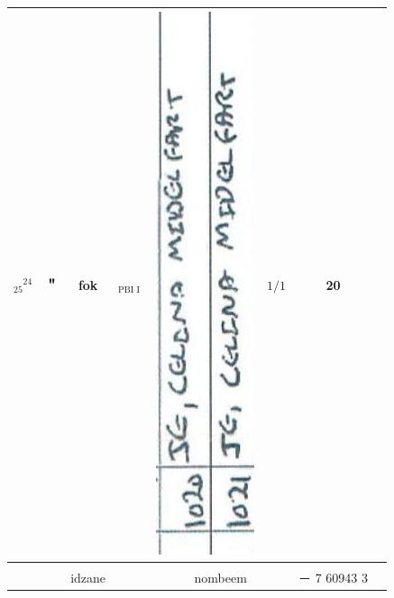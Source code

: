 \documentclass[10pt]{article}
\begin{document}
\begin{center}
\begin{tabular}{|c|c|c|c|c|c|c|c|c|c|}
\({ }_{25}{ }^{24}\) & ＂ & fok & \({ }_{\text {PBI I }}\) & \multicolumn{3}{|l|}{\includegraphics[max width=\textwidth]{2025_02_27_dd68c3d38de88f0516d9g-053(1)}
} & \(1 / 1\) & 20 &  \\
\hline
 &  &  &  &  &  &  &  &  &  \\
\hline
 &  & idzane &  &  &  & nombeem &  & － 7 60943 3 &  \\
\hline
\end{tabular}
\end{center}
\end{document}
